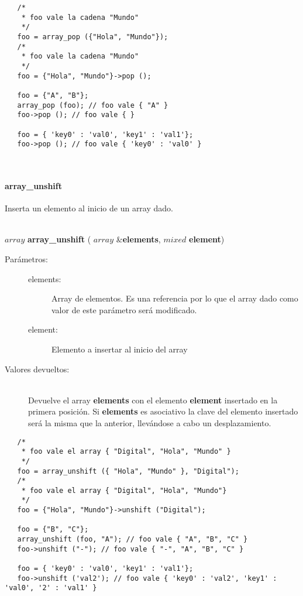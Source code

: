 \begin{lstlisting}   
   /*
    * foo vale la cadena "Mundo"
    */
   foo = array_pop ({"Hola", "Mundo"}); 
   /*
    * foo vale la cadena "Mundo"
    */
   foo = {"Hola", "Mundo"}->pop ();
   
   foo = {"A", "B"};
   array_pop (foo); // foo vale { "A" }
   foo->pop (); // foo vale { }
   
   foo = { 'key0' : 'val0', 'key1' : 'val1'};
   foo->pop (); // foo vale { 'key0' : 'val0' }
\end{lstlisting}
\hfill\\ 

\paragraph{array\_unshift}
Inserta un elemento al inicio de un array dado.

\hfill \\ $array$ \textbf{array\_unshift} ( $array$ \&\textbf{elements}, $mixed$ \textbf{element})  
\begin{description}
\item [Parámetros:] \hfill 
   \begin{description}
   \item[elements:] Array de elementos. Es una referencia por lo que el array dado como valor de este parámetro será modificado. 
   \item[element:] Elemento a insertar al inicio del array
   \end{description}
\item[Valores devueltos:] \hfill \\
   Devuelve el array \textbf{elements} con el elemento \textbf{element} insertado en la primera posición. Si \textbf{elements} es
   asociativo la clave del elemento insertado será la misma que la anterior, llevándose a cabo un desplazamiento. 
\end{description}
     
\begin{lstlisting}   
   /*
    * foo vale el array { "Digital", "Hola", "Mundo" }
    */
   foo = array_unshift ({ "Hola", "Mundo" }, "Digital"); 
   /*
    * foo vale el array { "Digital", "Hola", "Mundo"}
    */
   foo = {"Hola", "Mundo"}->unshift ("Digital");
   
   foo = {"B", "C"};
   array_unshift (foo, "A"); // foo vale { "A", "B", "C" }
   foo->unshift ("-"); // foo vale { "-", "A", "B", "C" }
   
   foo = { 'key0' : 'val0', 'key1' : 'val1'};
   foo->unshift ('val2'); // foo vale { 'key0' : 'val2', 'key1' : 'val0', '2' : 'val1' }
\end{lstlisting}
\hfill\\ 

